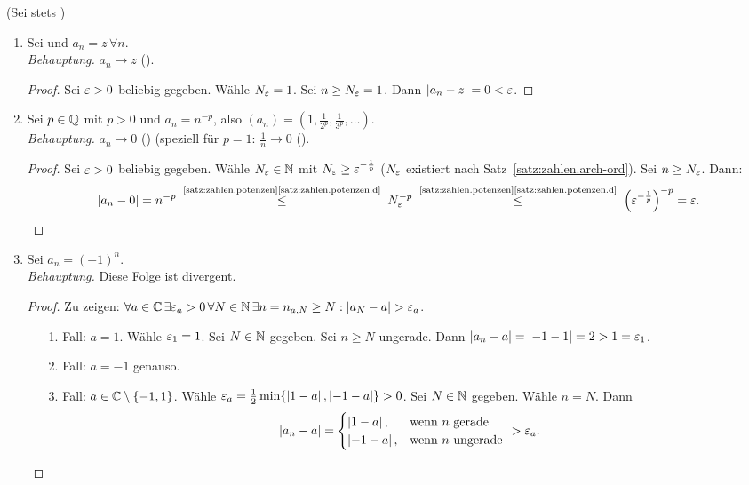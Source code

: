 \documentclass[12pt]{scrreprt}
\begin{document}
\begin{bsp}
  \label{bsp:konv.konv}
  (Sei stets )
  \begin{enumerate}
  \item Sei  und $a_n = z \,\forall n$.\\
    \emph{Behauptung.} $a_n\to z$ (\ninf).
    \begin{proof} Sei $\varepsilon>0$ beliebig gegeben. Wähle $N_\varepsilon=1$. Sei
      $n \ge N_\varepsilon=1$. Dann $\left\lvert a_n-z\right\lvert=0<\varepsilon$. \end{proof}
  \item Sei $p\in\mathbb{Q}$ mit $p>0$ und $a_n=n^{-p}$, also
    $(a_n)=(1,\frac{1}{2^p},\frac{1}{3^p}, \dotsc)$.\\
    \emph{Behauptung.} $a_n\to0$ (\ninf) (speziell für $p=1$:
    $\frac{1}{n}\to0$ (\ninf).
    \begin{proof} Sei $\varepsilon>0$ beliebig gegeben. Wähle $N_\varepsilon\in\mathbb{N}$
      mit $N_\varepsilon\ge\varepsilon^{-\frac{1}{p}}$ ($N_\varepsilon$ existiert nach
      Satz~\ref{satz:zahlen.arch-ord}). Sei $n\ge N_\varepsilon$. Dann:
      \[\abs{a_n-0}=n^{-p}
      \nach{\le}{\ref{satz:zahlen.potenzen}\ref{satz:zahlen.potenzen.d}}
      N_\ep^{-p}
      \nach{\le}{\ref{satz:zahlen.potenzen}\ref{satz:zahlen.potenzen.d}}
      \left(\ep^{-\frac{1}{p}}\right)^{-p}=\ep.\]
    \end{proof}
  \item Sei $a_n=(-1)^n$.\\
    \emph{Behauptung.} Diese Folge ist divergent.
    \begin{proof} Zu zeigen: $\forall a\in\mathbb{C}\,\exists \varepsilon_a>0
      \,\forall N\in\mathbb{N} \,\exists n=n_{a,N}\ge N:
      \left\lvert a_N-a\right\lvert>\varepsilon_a$.
      \begin{itemize}
      \item[1.]Fall: $a=1$. Wähle $\varepsilon_1=1$. Sei $N\in\mathbb{N}$ gegeben. Sei $n \ge N$ ungerade. Dann $\left\lvert a_n-a\right\lvert=\left\lvert-1-1\right\lvert=2>1=\varepsilon_1$.
      \item[2.]Fall: $a=-1$ genauso.
      \item[3.]Fall: $a\in\mathbb{C}\setminus\{-1,1\}$. Wähle
      $\varepsilon_a=\frac12\min\{\left\lvert1-a\right\lvert,\left\lvert-1-a\right\lvert\}>0$. Sei $N\in\mathbb{N}$
      gegeben. Wähle $n=N$. Dann \[\left\lvert a_n-a\right\lvert=\begin{cases}
        \left\lvert1-a\right\lvert, & \text{wenn }n\text{ gerade}\\ \left\lvert-1-a\right\lvert, &
        \text{wenn }n\text{ ungerade} \end{cases}\
      >\varepsilon_a.\] \end{itemize}\end{proof}
  \end{enumerate}
\end{bsp}
\end{document}
